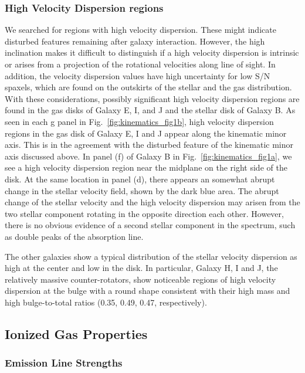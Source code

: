 \documentclass[fleqn,usenatbib]{mnras}
\begin{document}
\subsubsection{High Velocity Dispersion regions}
\label{sec:High_VD}

We searched for regions with high velocity dispersion.
These might indicate disturbed features remaining after galaxy interaction. 
However, the high inclination makes it difficult to distinguish
if a high velocity dispersion is intrinsic or arises from a
projection of the rotational velocities along line of sight.
In addition, the velocity dispersion values have high uncertainty
for low S/N spaxels, which are found on the outskirts
of the stellar and the gas distribution.
With these considerations, possibly significant high velocity dispersion regions 
are found in the gas disks of Galaxy E, I, and J and the stellar disk of Galaxy B.
As seen in each g panel in Fig.~\ref{fig:kinematics_fig1b}, 
high velocity dispersion regions in the gas disk of Galaxy E, I and J 
appear along the kinematic minor axis.
This is in the agreement with the disturbed feature 
of the kinematic minor axis discussed above.
In panel (f) of Galaxy B in
Fig.~\ref{fig:kinematics_fig1a}, 
we see a high velocity dispersion region near the midplane 
on the right side of the disk.
At the same location in panel (d), 
there appears an somewhat abrupt change in the stellar velocity field, 
shown by the dark blue area.
The abrupt change of the stellar velocity 
and the high velocity dispersion may arisen from the two stellar component rotating in the opposite direction each other. 
However, there is no obvious evidence of 
a second stellar component in the spectrum, 
such as double peaks of the absorption line.

The other galaxies show a typical distribution
of the stellar velocity dispersion as high at the center
and low in the disk. 
In particular, Galaxy H, I and J, the relatively massive counter-rotators,
show noticeable regions of high velocity dispersion 
at the bulge with a round shape consistent
with their high mass and high bulge-to-total ratios 
(0.35, 0.49, 0.47, respectively).




\subsection{Ionized Gas Properties} 
\label{sec:ionized_gas}

\subsubsection{Emission Line Strengths} 
\label{sec:emission_line_strength}
\end{document}
